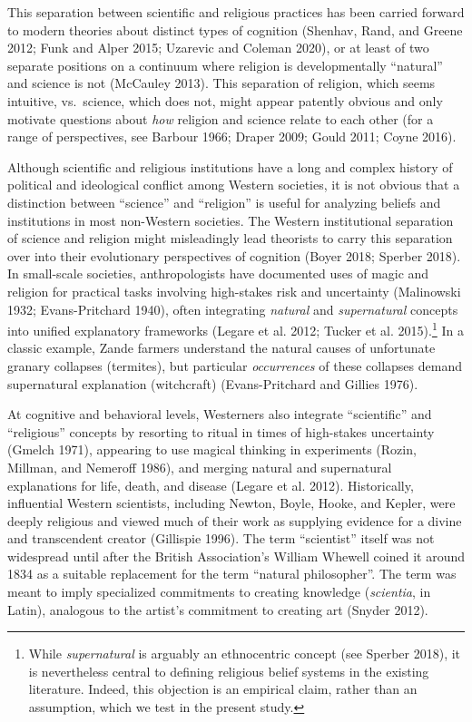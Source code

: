 \documentclass[
  11pt,
]{article}
\begin{document}
This separation between scientific and religious practices has been carried forward to modern theories about distinct types of cognition (Shenhav, Rand, and Greene 2012; Funk and Alper 2015; Uzarevic and Coleman 2020), or at least of two separate positions on a continuum where religion is developmentally ``natural'' and science is not (McCauley 2013). This separation of religion, which seems intuitive, vs.~science, which does not, might appear patently obvious and only motivate questions about \emph{how} religion and science relate to each other (for a range of perspectives, see Barbour 1966; Draper 2009; Gould 2011; Coyne 2016).

Although scientific and religious institutions have a long and complex history of political and ideological conflict among Western societies, it is not obvious that a distinction between ``science'' and ``religion'' is useful for analyzing beliefs and institutions in most non-Western societies. The Western institutional separation of science and religion might misleadingly lead theorists to carry this separation over into their evolutionary perspectives of cognition (Boyer 2018; Sperber 2018). In small-scale societies, anthropologists have documented uses of magic and religion for practical tasks involving high-stakes risk and uncertainty (Malinowski 1932; Evans-Pritchard 1940), often integrating \emph{natural} and \emph{supernatural} concepts into unified explanatory frameworks (Legare et al. 2012; Tucker et al. 2015).\footnote{While \emph{supernatural} is arguably an ethnocentric concept (see Sperber 2018), it is nevertheless central to defining religious belief systems in the existing literature. Indeed, this objection is an empirical claim, rather than an assumption, which we test in the present study.} In a classic example, Zande farmers understand the natural causes of unfortunate granary collapses (termites), but particular \emph{occurrences} of these collapses demand supernatural explanation (witchcraft) (Evans-Pritchard and Gillies 1976).

At cognitive and behavioral levels, Westerners also integrate ``scientific'' and ``religious'' concepts by resorting to ritual in times of high-stakes uncertainty (Gmelch 1971), appearing to use magical thinking in experiments (Rozin, Millman, and Nemeroff 1986), and merging natural and supernatural explanations for life, death, and disease (Legare et al. 2012). Historically, influential Western scientists, including Newton, Boyle, Hooke, and Kepler, were deeply religious and viewed much of their work as supplying evidence for a divine and transcendent creator (Gillispie 1996). The term ``scientist'' itself was not widespread until after the British Association's William Whewell coined it around 1834 as a suitable replacement for the term ``natural philosopher''. The term was meant to imply specialized commitments to creating knowledge (\emph{scientia}, in Latin), analogous to the artist's commitment to creating art (Snyder 2012).
\end{document}
